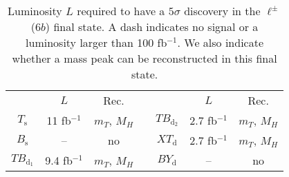\documentclass[12pt,a4paper]{article}
\newcommand{\fbin}{fb$^{-1}$}
\newcommand{\Ts}{T_\text{s}}
\newcommand{\Bs}{B_\text{s}}
\newcommand{\TBd}{TB_{\text{d}_1}}
\newcommand{\TBD}{TB_{\text{d}_2}}
\newcommand{\XTd}{XT_\text{d}}
\newcommand{\BYd}{BY_\text{d}}
\begin{document}
\begin{table}[ht]
\begin{center}
\begin{tabular}{ccccccc}
       & $L$        & Rec. & \quad &        & $L$       & Rec. \\[1mm]
$\Ts$  & 11  \fbin & $m_T$, $M_H$   &       & $\TBD$ & 2.7 \fbin & $m_T$, $M_H$ \\
$\Bs$  & --   & no   &       & $\XTd$ & 2.7 \fbin & $m_T$, $M_H$ \\
$\TBd$ & 9.4 \fbin & $m_T$, $M_H$   &       & $\BYd$ & --  & no
\end{tabular}
\end{center}
\caption{Luminosity $L$ required to have a $5\sigma$ discovery in the $\ell^\pm $ ($6b$) final state.
A dash indicates no signal or a luminosity larger than 100 \fbin.
We also indicate whether a mass peak can be reconstructed in this final state.}
\label{tab:sig-1Q1-6b}
\end{table}
\end{document}
